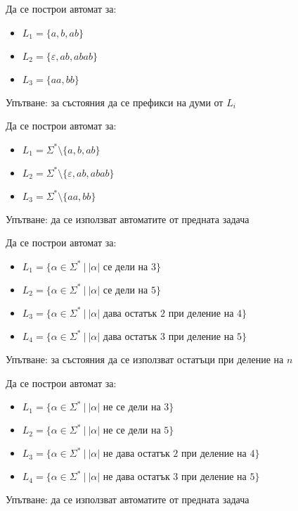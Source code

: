 \begin{problem}
Да се построи автомат за:
\begin{itemize}
    \item $L_1 = \{ a, b, ab \}$
    \item $L_2 = \{ \varepsilon, ab, abab \}$
    \item $L_3 = \{ aa, bb \}$
\end{itemize}
Упътване: за състояния да се префикси на думи от $L_i$
\end{problem}

\begin{problem}
Да се построи автомат за:
\begin{itemize}
    \item $L_1 = \Sigma^* \setminus \{ a, b, ab \}$
    \item $L_2 = \Sigma^* \setminus \{ \varepsilon, ab, abab \}$
    \item $L_3 = \Sigma^* \setminus \{ aa, bb \}$
\end{itemize}
Упътване: да се използват автоматите от предната задача
\end{problem}

\begin{problem}
Да се построи автомат за:
\begin{itemize}
    \item $L_1 = \{ \alpha \in \Sigma^* \: | \: |\alpha| \text{ се дели на } 3 \}$
    \item $L_2 = \{ \alpha \in \Sigma^* \: | \: |\alpha| \text{ се дели на } 5 \}$
    \item $L_3 = \{ \alpha \in \Sigma^* \: | \: |\alpha| \text{ дава остатък } 2 \text{ при деление на } 4 \}$
    \item $L_4 = \{ \alpha \in \Sigma^* \: | \: |\alpha| \text{ дава остатък } 3 \text{ при деление на } 5 \}$
\end{itemize}
Упътване: за състояния да се използват остатъци при деление на $n$
\end{problem}

\begin{problem}
Да се построи автомат за:
\begin{itemize}
    \item $L_1 = \{ \alpha \in \Sigma^* \: | \: |\alpha| \text{ не се дели на } 3 \}$
    \item $L_2 = \{ \alpha \in \Sigma^* \: | \: |\alpha| \text{ не се дели на } 5 \}$
    \item $L_3 = \{ \alpha \in \Sigma^* \: | \: |\alpha| \text{ не дава остатък } 2 \text{ при деление на } 4 \}$
    \item $L_4 = \{ \alpha \in \Sigma^* \: | \: |\alpha| \text{ не дава остатък } 3 \text{ при деление на } 5 \}$
\end{itemize}
Упътване: да се използват автоматите от предната задача
\end{problem}